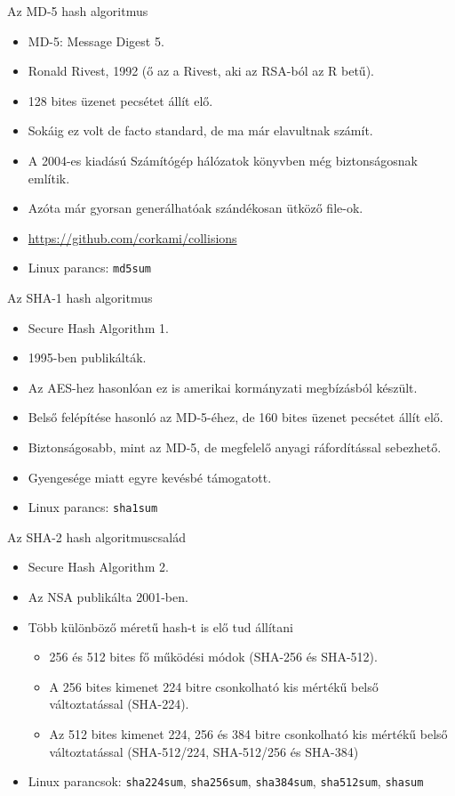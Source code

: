 \documentclass[12 pt]{beamer}
\begin{document}
\begin{frame}{Az MD-5 hash algoritmus}
  \begin{itemize}
    \item{MD-5: Message Digest 5.}
    \item{Ronald Rivest, 1992 (ő az a Rivest, aki az RSA-ból az R betű).}
    \item{128 bites üzenet pecsétet állít elő.}
    \item{Sokáig ez volt de facto standard, de ma már elavultnak számít.}
    \item{A 2004-es kiadású Számítógép hálózatok könyvben még biztonságosnak említik.}
    \item{Azóta már gyorsan generálhatóak szándékosan ütköző file-ok.}
    \item{\href{https://github.com/corkami/collisions}{https://github.com/corkami/collisions}}
    \item{Linux parancs: \texttt{md5sum}}
  \end{itemize}
\end{frame}

\begin{frame}{Az SHA-1 hash algoritmus}
  \begin{itemize}
    \item{Secure Hash Algorithm 1.}
    \item{1995-ben publikálták.}
    \item{Az AES-hez hasonlóan ez is amerikai kormányzati megbízásból készült.}
    \item{Belső felépítése hasonló az MD-5-éhez, de 160 bites üzenet pecsétet állít elő.}
    \item{Biztonságosabb, mint az MD-5, de megfelelő anyagi ráfordítással sebezhető.}
    \item{Gyengesége miatt egyre kevésbé támogatott.}
    \item{Linux parancs: \texttt{sha1sum}}
  \end{itemize}
\end{frame}

\begin{frame}{Az SHA-2 hash algoritmuscsalád}
  \begin{itemize}
    \item{Secure Hash Algorithm 2.}
    \item{Az NSA publikálta 2001-ben.}
    \item{Több különböző méretű hash-t is elő tud állítani}
      \begin{itemize}
        \item{256 és 512 bites fő működési módok (SHA-256 és SHA-512).}
        \item{A 256 bites kimenet 224 bitre csonkolható kis mértékű belső változtatással (SHA-224).}
        \item{Az 512 bites kimenet 224, 256 és 384 bitre csonkolható kis mértékű belső változtatással (SHA-512/224, SHA-512/256 és SHA-384)}
      \end{itemize}
    \item{Linux parancsok: \texttt{sha224sum}, \texttt{sha256sum}, \texttt{sha384sum}, \texttt{sha512sum}, \texttt{shasum}}
  \end{itemize}
\end{frame}
\end{document}
